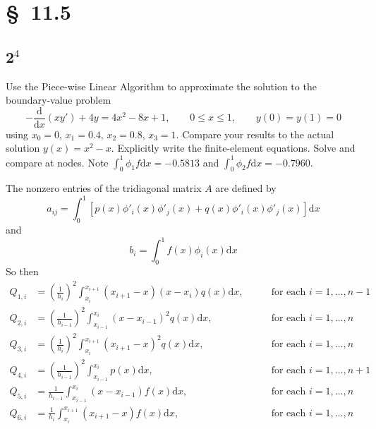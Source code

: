 \documentclass[12pt]{article}
\newcommand{\dd}[1]{\mathrm{d}{#1}}
\newcommand{\ddt}[1]{\frac{\dd{}}{\dd{#1}}}
\begin{document}
\section{\S~11.5}
\subsection{2$^4$}
Use the Piece-wise Linear Algorithm to approximate the solution to the
boundary-value problem
$$ -\ddt{x}(xy')+4y=4x^2-8x+1,\qquad 0\leq x\leq1,\qquad
y(0)=y(1)=0 $$ using $x_0=0$, $x_1=0.4$, $x_2=0.8$, $x_3=1$. Compare
your results to the actual solution $y(x)=x^2-x$. Explicitly write the
finite-element equations. Solve and compare at nodes. Note $\int_0^1\phi_1 f
\dd{x} = -0.5813$ and $\int_0^1\phi_2 f \dd{x} = -0.7960$.

The nonzero entries of the tridiagonal matrix $A$ are defined by
\begin{equation}
  \label{eq:piecewise-general-a}
  a_{ij} = \int_0^1[p(x)\phi'_i(x)\phi'_j(x)+q(x)\phi'_i(x)\phi'_j(x)]\dd{x}
\end{equation}
and
\begin{equation}
  \label{eq:piecewise-general-b}
  b_i = \int_0^1f(x)\phi_i(x)\dd{x}
\end{equation}
So then
\begin{equation}
  \begin{aligned}
    Q_{1,i}&=\left(\frac{1}{h_{i}}\right)^2\int_{x_i}^{x_{i+1}}(x_{i+1}-x)(x-x_{i})q(x)\dd{x},
    \qquad & \text{for each }i=1,\ldots,n-1 \\
    Q_{2,i}&=\left(\frac{1}{h_{i-1}}\right)^2\int_{x_{i-1}}^{x_{i}}(x-x_{i-1})^2q(x)\dd{x},
    \qquad & \text{for each }i=1,\ldots,n \\
    Q_{3,i}&=\left(\frac{1}{h_{i}}\right)^2\int_{x_i}^{x_{i+1}}(x_{i+1}-x)^2q(x)\dd{x},
    \qquad & \text{for each }i=1,\ldots,n \\
    Q_{4,i}&=\left(\frac{1}{h_{i-1}}\right)^2\int_{x_{i-1}}^{x_{i}}p(x)\dd{x},
    \qquad&  \text{for each }i=1,\ldots,n+1 \\
    Q_{5,i}&=\frac{1}{h_{i-1}}\int_{x_{i-1}}^{x_{i}}(x-x_{i-1})f(x)\dd{x},
    \qquad & \text{for each }i=1,\ldots,n \\
    Q_{6,i}&=\frac{1}{h_{i}}\int_{x_i}^{x_{i+1}}(x_{i+1}-x)f(x)\dd{x},
    \qquad & \text{for each }i=1,\ldots,n \\
  \end{aligned}
\end{equation}
\end{document}
